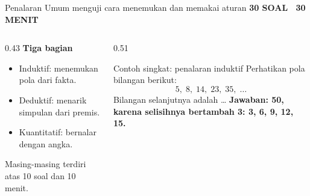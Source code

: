 \documentclass[aspectratio=169,11pt]{beamer}
\newcommand{\kicker}[1]{%
  {\color{StudentCyan}\bfseries\fontsize{10.5}{13}\selectfont\MakeUppercase{#1}}\par\vspace{0.11cm}
}
\newcommand{\answer}[1]{%
  \vspace{0.10cm}
  {\color{StudentGreen}\bfseries\fontsize{11.5}{14}\selectfont Jawaban: #1}
}
\begin{document}
\begin{frame}{Penalaran Umum menguji cara menemukan dan memakai aturan}
  \kicker{30 Soal \textbar\ 30 Menit}
  \begin{columns}[T,onlytextwidth]
    \begin{column}{0.43\textwidth}
      {\color{StudentBlue}\bfseries Tiga bagian}\par
      \begin{itemize}
        \item Induktif: menemukan pola dari fakta.
        \item Deduktif: menarik simpulan dari premis.
        \item Kuantitatif: bernalar dengan angka.
      \end{itemize}
      \vspace{0.10cm}
      {\color{StudentGray}\fontsize{10.8}{13.5}\selectfont Masing-masing terdiri atas 10 soal dan 10 menit.}
    \end{column}
    \begin{column}{0.51\textwidth}
      \begin{block}{Contoh singkat: penalaran induktif}
        Perhatikan pola bilangan berikut:
        \[
          5,\;8,\;14,\;23,\;35,\;\ldots
        \]
        Bilangan selanjutnya adalah \ldots
        \answer{50, karena selisihnya bertambah 3: 3, 6, 9, 12, 15.}
      \end{block}
    \end{column}
  \end{columns}
\end{frame}
\end{document}
